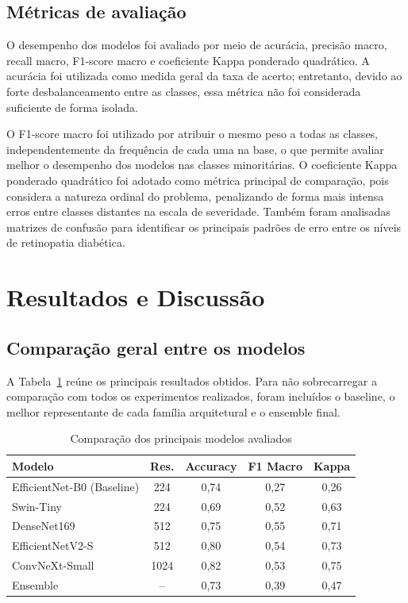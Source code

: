 \documentclass[conference]{IEEEtran}
\begin{document}
\subsection{Métricas de avaliação}

O desempenho dos modelos foi avaliado por meio de acurácia,
precisão macro, recall macro, F1-score macro e coeficiente Kappa
ponderado quadrático. A acurácia foi utilizada como medida geral da
taxa de acerto; entretanto, devido ao forte desbalanceamento entre as
classes, essa métrica não foi considerada suficiente de forma
isolada.

O F1-score macro foi utilizado por atribuir o mesmo peso a todas as
classes, independentemente da frequência de cada uma na base, o que
permite avaliar melhor o desempenho dos modelos nas classes
minoritárias. O coeficiente Kappa ponderado quadrático foi adotado
como métrica principal de comparação, pois considera a natureza
ordinal do problema, penalizando de forma mais intensa erros entre
classes distantes na escala de severidade. Também foram analisadas
matrizes de confusão para identificar os principais padrões de erro
entre os níveis de retinopatia diabética.

\section{Resultados e Discussão}

\subsection{Comparação geral entre os modelos}

A Tabela~\ref{tab:comparacao_modelos} reúne os principais resultados
obtidos. Para não sobrecarregar a comparação com todos os
experimentos realizados, foram incluídos o baseline, o melhor
representante de cada família arquitetural e o ensemble final.

\begin{table}[htbp]
\caption{Comparação dos principais modelos avaliados}
\label{tab:comparacao_modelos}
\centering
\scriptsize
\begin{tabular}{l c c c c}
\hline
\textbf{Modelo} & \textbf{Res.} & \textbf{Accuracy} & \textbf{F1 Macro} & \textbf{Kappa} \\
\hline
EfficientNet-B0 (Baseline) & 224  & 0,74 & 0,27 & 0,26 \\
Swin-Tiny                  & 224  & 0,69 & 0,52 & 0,63 \\
DenseNet169                & 512  & 0,75 & 0,55 & 0,71 \\
EfficientNetV2-S           & 512  & 0,80 & 0,54 & 0,73 \\
ConvNeXt-Small             & 1024 & 0,82 & 0,53 & 0,75 \\
Ensemble                   & --   & 0,73 & 0,39 & 0,47 \\
\hline
\end{tabular}
\end{table}
\end{document}
